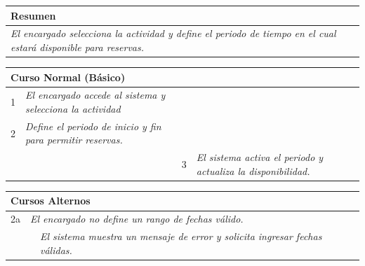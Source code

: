 \begin{table}[H]
    \begin{tabular}{llllllll}
    \hline
    \multicolumn{8}{|l|}{\cellcolor[HTML]{F2F2F2}Resumen} \\ \hline
    \multicolumn{8}{|p{15cm}|}{{\color[HTML]{808080} \textit{El encargado selecciona la actividad y define el periodo de tiempo en el cual estará disponible para reservas.}}} \\ \hline
    \end{tabular}
\end{table}



\begin{table}[H]
    \begin{tabular}{llllllll}
    \hline
    \multicolumn{8}{|l|}{\cellcolor[HTML]{F2F2F2}Curso Normal (Básico)} \\ \hline
    \multicolumn{1}{|c|}{1} & \multicolumn{1}{p{6cm}|}{{\color[HTML]{808080} \textit{El encargado accede al sistema y selecciona la actividad}}} & \multicolumn{1}{c|}{} & \multicolumn{5}{p{6cm}|}{} \\ \hline
    \multicolumn{1}{|c|}{2} & \multicolumn{1}{p{6cm}|}{{\color[HTML]{808080} \textit{Define el periodo de inicio y fin para permitir reservas.}}} & \multicolumn{1}{c|}{} & \multicolumn{5}{p{6cm}|}{} \\ \hline
    \multicolumn{1}{|c|}{} & \multicolumn{1}{p{6cm}|}{} & \multicolumn{1}{c|}{3} & \multicolumn{5}{p{6cm}|}{{\color[HTML]{808080} \textit{El sistema activa el periodo y actualiza la disponibilidad.}}} \\ \hline
    \end{tabular}
    
\end{table}

\begin{table}[H]
    \begin{tabular}{llllllll}
    \hline
    \multicolumn{8}{|l|}{\cellcolor[HTML]{F2F2F2}Cursos Alternos} \\ \hline
    \multicolumn{1}{|c|}{2a} & \multicolumn{7}{l|}{{\color[HTML]{808080} \textit{El encargado no define un rango de fechas válido.}}} \\ \hline
    \multicolumn{1}{|c|}{} & \multicolumn{1}{l|}{} & \multicolumn{6}{l|}{{\color[HTML]{808080} \textit{El sistema muestra un mensaje de error y solicita ingresar fechas válidas.}}} \\ \hline
    \end{tabular}
\end{table}


